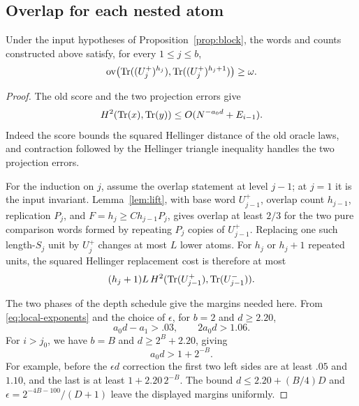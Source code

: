 \subsection{Overlap for each nested atom}\label{sec:side-overlap}

\begin{lemma}\label{lem:nested-overlap}
Under the input hypotheses of Proposition~\ref{prop:block}, the words and counts constructed above satisfy, for every $1\le j\le b$,
\[
 \operatorname{ov}\bigl(\mathrm{Tr}((U_j^+)^{h_j}),\mathrm{Tr}((U_j^+)^{h_j+1})\bigr)\ge\omega.
\]
\end{lemma}

\begin{proof}
The old score and the two projection errors give
\begin{equation}\label{eq:old_H}
 H^2(\mathrm{Tr}(x),\mathrm{Tr}(y))\le O(N^{-a_0d}+E_{i-1}).
\end{equation}
Indeed the score bounds the squared Hellinger distance of the old oracle laws, and contraction followed by the Hellinger triangle inequality handles the two projection errors.

For the induction on $j$, assume the overlap statement at level $j-1$; at $j=1$ it is the input invariant.  Lemma~\ref{lem:lift}, with base word $U_{j-1}^+$, overlap count $h_{j-1}$, replication $P_j$, and $F=h_j\ge C h_{j-1}P_j$, gives overlap at least $2/3$ for the two pure comparison words formed by repeating $P_j$ copies of $U_{j-1}^+$.  Replacing one such length-$S_j$ unit by $U_j^+$ changes at most $L$ lower atoms.  For $h_j$ or $h_j+1$ repeated units, the squared Hellinger replacement cost is therefore at most
\begin{equation}\label{eq:nested-replacement}
 (h_j+1)L\,H^2(\mathrm{Tr}(U_{j-1}^+),\mathrm{Tr}(U_{j-1}^-)).
\end{equation}

The two phases of the depth schedule give the margins needed here.  From \eqref{eq:local-exponents} and the choice of $\epsilon$, for $b=2$ and $d\ge2.20$,
\begin{equation}\label{eq:b2gap}
 a_0d-a_1>.03,\qquad 2a_0d>1.06.
\end{equation}
For $i>j_0$, we have $b=B$ and $d\ge2^B+2.20$, giving
\begin{equation}\label{eq:bbgap}
 a_0d>1+2^{-B}.
\end{equation}
For example, before the $\epsilon d$ correction the first two left sides are at least $.05$ and $1.10$, and the last is at least $1+2.20\,2^{-B}$.  The bound $d\le2.20+(B/4)D$ and $\epsilon=2^{-4B-100}/(D+1)$ leave the displayed margins uniformly.


\end{proof}
